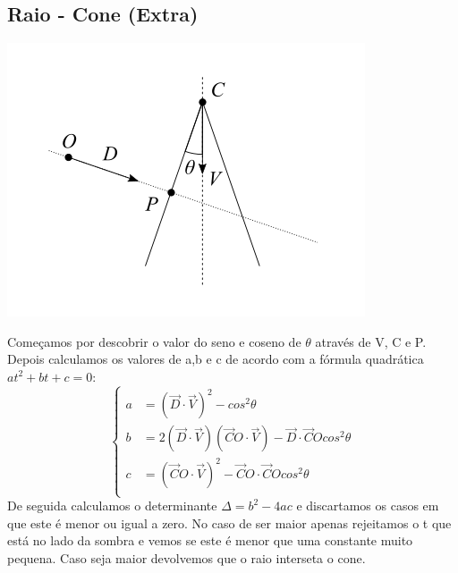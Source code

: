\documentclass{article}
\begin{document}
    \subsection*{Raio - Cone (Extra)}
        \begin{center}
            \includegraphics[scale=0.40]{cone}
        \end{center}
        \par
        Começamos por descobrir o valor do seno e coseno de $ \theta $ através de V, C e P. Depois calculamos os valores de a,b e c de acordo com a fórmula quadrática
        $ at^2 + bt + c = 0 $:
        \begin{equation*}
            \begin{cases}
                a &= (\overrightarrow{D} \cdot \overrightarrow{V})^2 - cos^2 \theta \\
                b &= 2(\overrightarrow{D} \cdot \overrightarrow{V})(\overrightarrow{C}O \cdot \overrightarrow{V}) - \overrightarrow{D} \cdot \overrightarrow{C}O cos^2 \theta \\
                c &= (\overrightarrow{C}O \cdot \overrightarrow{V})^2 - \overrightarrow{C}O \cdot \overrightarrow{C}O cos^2 \theta \\
            \end{cases}
        \end{equation*}
        De seguida calculamos o determinante $\Delta = b^2 - 4ac$ e discartamos os casos em que este é menor ou igual a zero. No caso de ser maior apenas 
        rejeitamos o t que está no lado da sombra e vemos se este é menor que uma constante muito pequena. Caso seja maior devolvemos que o raio interseta o cone.
\end{document}
